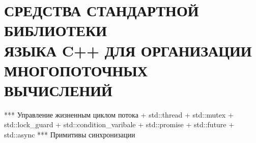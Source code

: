 \section[%
Средства стандартной библиотеки языка C++ для \\
организации многопоточных вычислений]{%
  СРЕДСТВА СТАНДАРТНОЙ БИБЛИОТЕКИ \\
  ЯЗЫКА C++ ДЛЯ ОРГАНИЗАЦИИ \\
  МНОГОПОТОЧНЫХ ВЫЧИСЛЕНИЙ
}

*** Управление жизненным циклом потока
    + std::thread
    + std::mutex
    + std::lock\_guard
    + std::condition\_varibale
    + std::promise
    + std::future
    + std::async
*** Примитивы синхронизации
